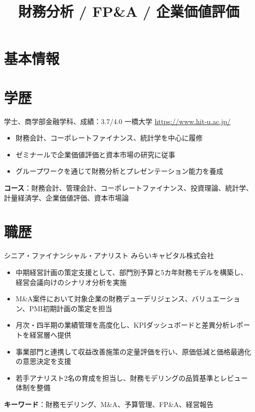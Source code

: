 \documentclass[a4paper, serif, 10pt]{moderncv}
\title{財務分析 / FP\&A / 企業価値評価}
\begin{document}
\maketitle

\section{基本情報}

\section{学歴}

        {学士、商学部金融学科、成績：3.7/4.0}
        {一橋大学}
        {\url{https://www.hit-u.ac.jp/}}
        {}
        {\begin{itemize}
\item 財務会計、コーポレートファイナンス、統計学を中心に履修
\item ゼミナールで企業価値評価と資本市場の研究に従事
\item グループワークを通じて財務分析とプレゼンテーション能力を養成
\end{itemize}
\textbf{コース}：財務会計、管理会計、コーポレートファイナンス、投資理論、統計学、計量経済学、企業価値評価、資本市場論}
\section{職歴}

        {シニア・ファイナンシャル・アナリスト}
        {みらいキャピタル株式会社}
        {}
        {}
        {\begin{itemize}
\item 中期経営計画の策定支援として、部門別予算と5カ年財務モデルを構築し、経営会議向けのシナリオ分析を実施
\item M\&A案件において対象企業の財務デューデリジェンス、バリュエーション、PMI初期計画の策定を担当
\item 月次・四半期の業績管理を高度化し、KPIダッシュボードと差異分析レポートを経営層へ提供
\item 事業部門と連携して収益改善施策の定量評価を行い、原価低減と価格最適化の意思決定を支援
\item 若手アナリスト2名の育成を担当し、財務モデリングの品質基準とレビュー体制を整備
\end{itemize}
\textbf{キーワード}：財務モデリング、M\&A、予算管理、FP\&A、経営報告}
\end{document}
